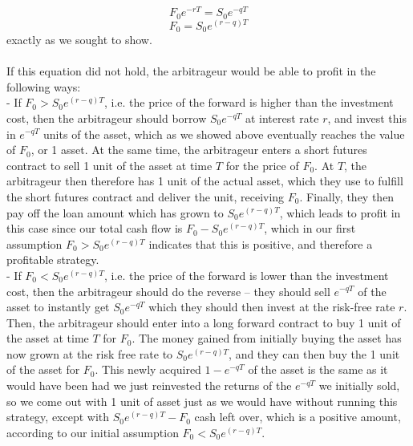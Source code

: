 \documentclass{article}
\begin{document}
{\[
  F_0e^{-rT} = S_0e^{-qT}
\]
\[
  F_0 = S_0e^{(r-q)T}
\]
exactly as we sought to show. \\ \\
If this equation did not hold, the arbitrageur would be able to profit in the following ways: \\
- If \(F_0 > S_0e^{(r-q)T}\), i.e. the price of the forward is higher than the investment cost, then the arbitrageur should borrow \(S_0e^{-qT}\) at interest rate \(r\), and invest this in \(e^{-qT}\) units of the asset, which as we showed above eventually reaches the value of \(F_0\), or 1 asset. At the same time, the arbitrageur enters a short futures contract to sell 1 unit of the asset at time \(T\) for the price of \(F_0\). At \(T\), the arbitrageur then therefore has 1 unit of the actual asset, which they use to fulfill the short futures contract and deliver the unit, receiving \(F_0\). Finally, they then pay off the loan amount which has grown to \(S_0e^{(r-q)T}\), which leads to profit in this case since our total cash flow is \(F_0 - S_0e^{(r-q)T}\), which in our first assumption \(F_0 > S_0e^{(r-q)T}\) indicates that this is positive, and therefore a profitable strategy. \\
- If \(F_0 < S_0e^{(r-q)T}\), i.e. the price of the forward is lower than the investment cost, then the arbitrageur should do the reverse -- they should sell \(e^{-qT}\) of the asset to instantly get \(S_0e^{-qT}\) which they should then invest at the risk-free rate \(r\). Then, the arbitrageur should enter into a long forward contract to buy 1 unit of the asset at time \(T\) for \(F_0\). The money gained from initially buying the asset has now grown at the risk free rate to \(S_0e^{(r-q)T}\), and they can then buy the 1 unit of the asset for \(F_0\). This newly acquired \(1 - e^{-qT}\) of the asset is the same as it would have been had we just reinvested the returns of the \(e^{-qT}\) we initially sold, so we come out with 1 unit of asset just as we would have without running this strategy, except with \(S_0e^{(r-q)T} - F_0\) cash left over, which is a positive amount, according to our initial assumption \(F_0 < S_0e^{(r-q)T}\). 

}
\end{document}
